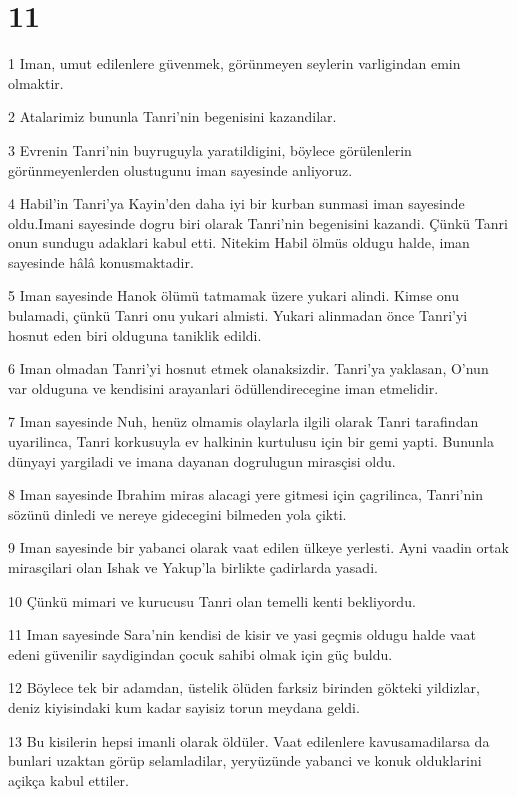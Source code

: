 \chapter{11}

\par 1 Iman, umut edilenlere güvenmek, görünmeyen seylerin varligindan emin olmaktir.
\par 2 Atalarimiz bununla Tanri'nin begenisini kazandilar.
\par 3 Evrenin Tanri'nin buyruguyla yaratildigini, böylece görülenlerin görünmeyenlerden olustugunu iman sayesinde anliyoruz.
\par 4 Habil'in Tanri'ya Kayin'den daha iyi bir kurban sunmasi iman sayesinde oldu.Imani sayesinde dogru biri olarak Tanri'nin begenisini kazandi. Çünkü Tanri onun sundugu adaklari kabul etti. Nitekim Habil ölmüs oldugu halde, iman sayesinde hâlâ konusmaktadir.
\par 5 Iman sayesinde Hanok ölümü tatmamak üzere yukari alindi. Kimse onu bulamadi, çünkü Tanri onu yukari almisti. Yukari alinmadan önce Tanri'yi hosnut eden biri olduguna taniklik edildi.
\par 6 Iman olmadan Tanri'yi hosnut etmek olanaksizdir. Tanri'ya yaklasan, O'nun var olduguna ve kendisini arayanlari ödüllendirecegine iman etmelidir.
\par 7 Iman sayesinde Nuh, henüz olmamis olaylarla ilgili olarak Tanri tarafindan uyarilinca, Tanri korkusuyla ev halkinin kurtulusu için bir gemi yapti. Bununla dünyayi yargiladi ve imana dayanan dogrulugun mirasçisi oldu.
\par 8 Iman sayesinde Ibrahim miras alacagi yere gitmesi için çagrilinca, Tanri'nin sözünü dinledi ve nereye gidecegini bilmeden yola çikti.
\par 9 Iman sayesinde bir yabanci olarak vaat edilen ülkeye yerlesti. Ayni vaadin ortak mirasçilari olan Ishak ve Yakup'la birlikte çadirlarda yasadi.
\par 10 Çünkü mimari ve kurucusu Tanri olan temelli kenti bekliyordu.
\par 11 Iman sayesinde Sara'nin kendisi de kisir ve yasi geçmis oldugu halde vaat edeni güvenilir saydigindan çocuk sahibi olmak için güç buldu.
\par 12 Böylece tek bir adamdan, üstelik ölüden farksiz birinden gökteki yildizlar, deniz kiyisindaki kum kadar sayisiz torun meydana geldi.
\par 13 Bu kisilerin hepsi imanli olarak öldüler. Vaat edilenlere kavusamadilarsa da bunlari uzaktan görüp selamladilar, yeryüzünde yabanci ve konuk olduklarini açikça kabul ettiler.
